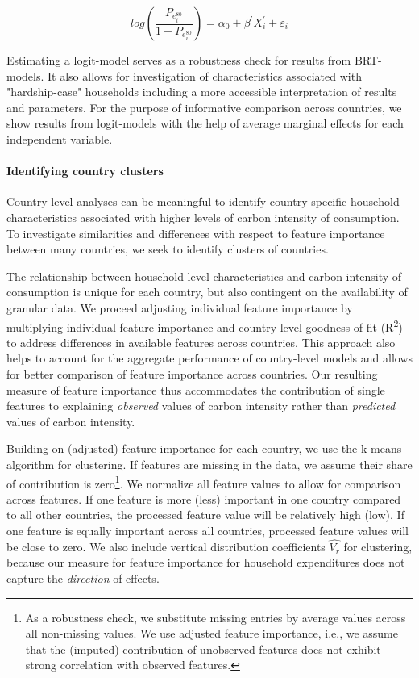 \documentclass[12pt, a4paper]{article}
\begin{document}
\begin{equation} \label{logit}
    log \left( \frac{P_{e_{i}^{80}}}{1 - P_{e_{i}^{80}}} \right) = \alpha_{0} + \beta^{'} X_{i}^{'} + \varepsilon_{i}
\end{equation}

Estimating a logit-model serves as a robustness check for results from BRT-models. It also allows for investigation of characteristics associated with "hardship-case" households including a more accessible interpretation of results and parameters. For the purpose of informative comparison across countries, we show results from logit-models with the help of average marginal effects for each independent variable.

\paragraph{Identifying country clusters} Country-level analyses can be meaningful to identify country-specific household characteristics associated with higher levels of carbon intensity of consumption. To investigate similarities and differences with respect to feature importance between many countries, we seek to identify clusters of countries. 

The relationship between household-level characteristics and carbon intensity of consumption is unique for each country, but also contingent on the availability of granular data. We proceed adjusting individual feature importance by multiplying individual feature importance and country-level goodness of fit (R\textsuperscript{2}) to address differences in available features across countries. This approach also helps to account for the aggregate performance of country-level models and allows for better comparison of feature importance across countries. Our resulting measure of feature importance thus accommodates the contribution of single features to explaining \textit{observed} values of carbon intensity rather than \textit{predicted} values of carbon intensity.

Building on (adjusted) feature importance for each country, we use the k-means algorithm for clustering. If features are missing in the data, we assume their share of contribution is zero\footnote{As a robustness check, we substitute missing entries by average values across all non-missing values. We use adjusted feature importance, i.e., we assume that the (imputed) contribution of unobserved features does not exhibit strong correlation with observed features.}. We normalize all feature values to allow for comparison across features. If one feature is more (less) important in one country compared to all other countries, the processed feature value will be relatively high (low). If one feature is equally important across all countries, processed feature values will be close to zero. We also include vertical distribution coefficients $\hat{V_{r}}$ for clustering, because our measure for feature importance for household expenditures does not capture the \textit{direction} of effects.
\end{document}
